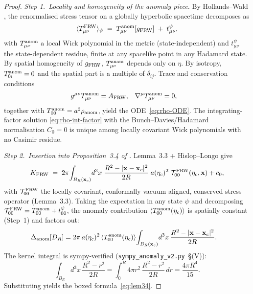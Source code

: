 \documentclass[11pt]{article}
\begin{document}
\begin{proof}
\emph{Step 1.\ Locality and homogeneity of the anomaly piece.}  By
Hollands--Wald \cite[\S5]{HollandsWald2001}, the renormalised stress
tensor on a globally hyperbolic spacetime decomposes as
\begin{equation*}
   \langle T^{\rm FRW}_{\mu\nu}\rangle_\psi
   \;=\;
   T^{\rm anom}_{\mu\nu}[g_{\rm FRW}] \;+\; t^{\psi}_{\mu\nu},
\end{equation*}
with $T^{\rm anom}_{\mu\nu}$ a local Wick polynomial in the metric
(state-independent) and $t^{\psi}_{\mu\nu}$ the state-dependent residue,
finite at any spacelike point in any Hadamard state.  By spatial
homogeneity of $g_{\rm FRW}$, $T^{\rm anom}_{\mu\nu}$ depends only on
$\eta$.  By isotropy, $T^{\rm anom}_{0i}=0$ and the spatial part is a
multiple of $\delta_{ij}$.  Trace and conservation conditions
\begin{align*}
   g^{\mu\nu}T^{\rm anom}_{\mu\nu}&=A_{\rm FRW},
   &\nabla^\mu T^{\rm anom}_{\mu\nu}&=0,
\end{align*}
together with $T^{\rm anom}_{00}=a^2\rho_{\rm anom}$, yield the
ODE~\eqref{eq:rho-ODE}.  The integrating-factor solution
\eqref{eq:rho-int-factor} with the Bunch--Davies/Hadamard normalisation
$C_0=0$ is unique among locally covariant Wick polynomials with
no Casimir residue.

\smallskip
\emph{Step 2.\ Insertion into Proposition~3.4 of \cite{Lemma33}.}
Lemma~3.3 + Hislop--Longo \cite{HislopLongo1982} give
\begin{equation*}
   K_{\rm FRW}
   \;=\; 2\pi\!\int_{B_R(\mathbf{x}_c)}\!d^3x\;
        \frac{R^2-|\mathbf{x}-\mathbf{x}_c|^2}{2R}\;
        a(\eta_c)^2\;\mathcal{T}^{\rm FRW}_{00}(\eta_c,\mathbf{x})
        + c_0,
\end{equation*}
with $\mathcal{T}^{\rm FRW}_{00}$ the locally covariant, conformally
vacuum-aligned, conserved stress operator (Lemma~3.3).  Taking the
expectation in any state $\psi$ and decomposing
$\mathcal{T}^{\rm FRW}_{00}=T^{\rm anom}_{00}+t^{\psi}_{00}$, the
anomaly contribution $\langle T^{\rm anom}_{00}(\eta_c)\rangle$ is
spatially constant (Step~1) and factors out:
\begin{align*}
   \Delta_{\rm anom}[D_R]
   &=2\pi\,a(\eta_c)^2\,
        \langle T^{\rm anom}_{00}(\eta_c)\rangle\!
        \int_{B_R(\mathbf{x}_c)}\!d^3 x\,\frac{R^2-|\mathbf{x}-\mathbf{x}_c|^2}{2R}.
\end{align*}
The kernel integral is sympy-verified
(\texttt{sympy\_anomaly\_v2.py}~\S(V)):
\begin{equation}
   \int_{B_R}\!d^3x\,\frac{R^2-r^2}{2R}
   =\int_0^R\!4\pi r^2\,\frac{R^2-r^2}{2R}\,dr
   =\frac{4\pi R^4}{15}.
   \label{eq:kernel-integral}
\end{equation}
Substituting yields the boxed formula~\eqref{eq:lem34}.


\end{proof}
\end{document}
